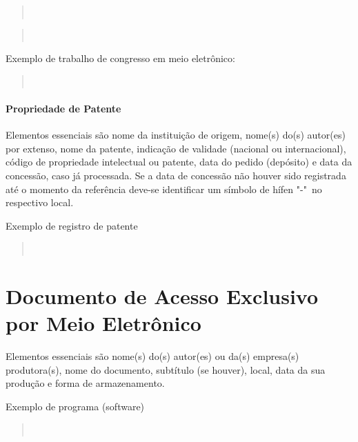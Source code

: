 \documentclass[repeatfields,xlists,xpacks,oneside,yearsonly]{ufrgscca}
\begin{document}
\begin{appendix}
        \begin{quote}\noindent{}\\\end{quote}

        \begin{quote}\noindent{}\\\end{quote}


        Exemplo de trabalho de congresso em meio eletrônico:\\

        \begin{quote}\noindent{}\\\end{quote}


        \paragraph{Propriedade de Patente}

        Elementos essenciais são nome da instituição de origem, nome(s) do(s)
        autor(es) por extenso, nome da patente, indicação de validade (nacional ou
        internacional), código de propriedade intelectual ou patente, data do pedido
        (depósito) e data da concessão, caso já processada. Se a data de concessão
        não houver sido registrada até o momento da referência deve-se identificar
        um símbolo de hífen "-"\ no respectivo local.

        Exemplo de registro de patente \\

        \begin{quote}\noindent{}\\\end{quote}


        \section{Documento de Acesso Exclusivo por Meio Eletrônico}

        Elementos essenciais são nome(s) do(s) autor(es) ou da(s) empresa(s)
        produtora(s), nome do documento, subtítulo (se houver), local, data da sua
        produção e forma de armazenamento.

        Exemplo de programa (software)\\

        \begin{quote}\noindent{}\\\end{quote}




\end{appendix}
\end{document}
